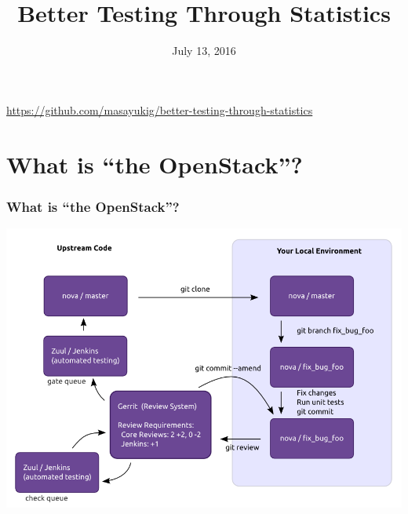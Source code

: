 \documentclass[aspectratio=169,11pt,hyperref={colorlinks=true}]{beamer}
\author[Matthew Treinish & Masayuki Igawa]{%
    \texorpdfstring{%
        \begin{columns}
            \column{.45\linewidth}
            \centering
            Matthew Treinish\\
            \href{mailto:mtreinish@kortar.org}{mtreinish@kortar.org}\\
        \texttt{mtreinish on Freenode}
        \column{.45\linewidth}
            \centering
            Masayuki Igawa\\
            \href{mailto:masayuki.igawa@gmail.com}{masayuki.igawa@gmail.com}\\
            \texttt{masayukig on Freenode}
        \end{columns}
        }
    {Matthew Treinish & Masayuki Igawa}
}
\date{July 13, 2016}
\title[Better Testing Through Statistics
\hspace{2em}\insertframenumber/\inserttotalframenumber]{Better Testing Through Statistics}
\begin{document}
{%
\begin{frame}[noframenumbering]
    \hypersetup{colorlinks,urlcolor=white}
    \titlepage{}
    \centering
    \href{https://github.com/masayukig/better-testing-through-statistics}{https://github.com/masayukig/better-testing-through-statistics}
\end{frame}
}

\section{What is ``the OpenStack''?}
\begin{frame}
    \frametitle{What is ``the OpenStack''?}
	\begin{center}
		\includegraphics[width=.65\textwidth]{code_review.png}
	\end{center}
\end{frame}
\end{document}
